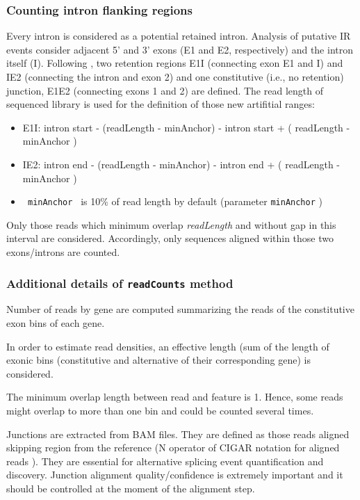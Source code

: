 \documentclass{article}
\begin{document}
\subsubsection{ Counting intron flanking regions }
\label{sec:intronFlanking}

Every intron is considered as a potential retained intron. Analysis of putative
IR events consider adjacent 5' and 3' exons (E1 and E2, respectively) and the
intron itself (I). Following \cite{ pmid25258385 }, two retention regions E1I 
(connecting exon E1 and I) and IE2 (connecting the intron and exon 2) and one
constitutive (i.e., no retention) junction, E1E2 (connecting exons 1 and 2) are
defined. The read length of sequenced library is used for the definition of 
those new artifitial ranges:

\begin{itemize}
  \item E1I: intron start - (readLength - minAnchor) - intron start + (
  readLength - minAnchor )
  \item IE2: intron end - (readLength - minAnchor) - intron end + ( readLength -
  minAnchor )
  \item \texttt{ minAnchor } is 10\% of read length by default (parameter
  \texttt{minAnchor} )
\end{itemize}

Only those reads which minimum overlap \textit{readLength} and without gap in 
this interval are considered. Accordingly, only sequences aligned within those 
two exons/introns are counted.

\subsubsection{ Additional details of \texttt{readCounts} method }

Number of reads by gene are computed summarizing the reads of the constitutive 
exon bins of each gene.

In order to estimate read densities, an effective length (sum of the length of 
exonic bins (constitutive and alternative of their corresponding gene) is
considered.

The minimum overlap length between read and feature is 1. Hence, some reads
might overlap to more than one bin  and could be counted several times.

Junctions are extracted from BAM files. They are defined as those reads
aligned skipping region from the reference (N operator of CIGAR notation
for aligned reads \cite{pmid19505943} ). They are essential for alternative
splicing event quantification and discovery. Junction alignment
quality/confidence is extremely important and it should be controlled at the
moment of the alignment step.
\end{document}
